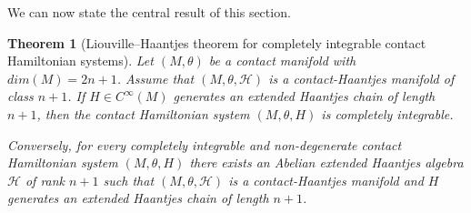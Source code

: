 \documentclass[10pt]{amsart}
\numberwithin{equation}{section}
\newtheorem{theorem}{Theorem}
\theoremstyle{definition}
\begin{document}
We can now state the central result of this section.
\begin{theorem}[Liouville--Haantjes theorem for completely integrable contact Hamiltonian systems]
\label{theo:LH}
Let $(M,\theta)$ be a contact manifold with $dim(M)=2n+1$.
Assume that $(M,\theta,\mathscr{H})$ is a contact-Haantjes manifold of class $n+1$. If $H\in C^{\infty}(M)$ generates an extended Haantjes chain of length $n+1$, then the contact Hamiltonian system $(M,\theta,H)$ is completely integrable.

Conversely, for every completely integrable and non-degenerate contact Hamiltonian system $(M,\theta,H)$ there exists an Abelian extended Haantjes algebra $\mathscr{H}$ of rank $n+1$ such that $(M,\theta,\mathscr{H})$ is a contact-Haantjes manifold and $H$ generates an extended Haantjes chain of length $n+1$. 
\end{theorem}
\end{document}
